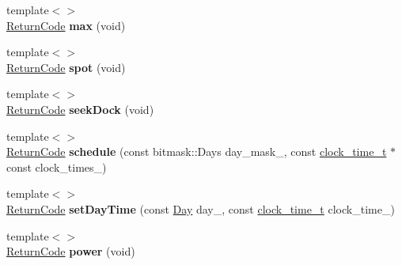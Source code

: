 \begin{DoxyCompactItemize}
\item 
\hypertarget{classroomba_1_1_open_interface_afea611c218b6c8d7af64409b6a982d09}{{\footnotesize template$<$$>$ }\\\hyperlink{namespaceroomba_aff53babe0af88b1ea8b066fd18b8f23f}{Return\+Code} {\bfseries max} (void)}\label{classroomba_1_1_open_interface_afea611c218b6c8d7af64409b6a982d09}

\item 
\hypertarget{classroomba_1_1_open_interface_a4eca715002e88e25727691448a3bcd13}{{\footnotesize template$<$$>$ }\\\hyperlink{namespaceroomba_aff53babe0af88b1ea8b066fd18b8f23f}{Return\+Code} {\bfseries spot} (void)}\label{classroomba_1_1_open_interface_a4eca715002e88e25727691448a3bcd13}

\item 
\hypertarget{classroomba_1_1_open_interface_a7674a0e4492d567d8ccfc0046a950e89}{{\footnotesize template$<$$>$ }\\\hyperlink{namespaceroomba_aff53babe0af88b1ea8b066fd18b8f23f}{Return\+Code} {\bfseries seek\+Dock} (void)}\label{classroomba_1_1_open_interface_a7674a0e4492d567d8ccfc0046a950e89}

\item 
\hypertarget{classroomba_1_1_open_interface_a50af82cf88624fb4d647ed61efe618e3}{{\footnotesize template$<$$>$ }\\\hyperlink{namespaceroomba_aff53babe0af88b1ea8b066fd18b8f23f}{Return\+Code} {\bfseries schedule} (const bitmask\+::\+Days day\+\_\+mask\+\_\+, const \hyperlink{structroomba_1_1clock__time__t}{clock\+\_\+time\+\_\+t} $\ast$const clock\+\_\+times\+\_\+)}\label{classroomba_1_1_open_interface_a50af82cf88624fb4d647ed61efe618e3}

\item 
\hypertarget{classroomba_1_1_open_interface_a0a3e629eb47acbff3cdd24bd3c0c8971}{{\footnotesize template$<$$>$ }\\\hyperlink{namespaceroomba_aff53babe0af88b1ea8b066fd18b8f23f}{Return\+Code} {\bfseries set\+Day\+Time} (const \hyperlink{namespaceroomba_a30df4953fe65b5b801c82a16865e50e1}{Day} day\+\_\+, const \hyperlink{structroomba_1_1clock__time__t}{clock\+\_\+time\+\_\+t} clock\+\_\+time\+\_\+)}\label{classroomba_1_1_open_interface_a0a3e629eb47acbff3cdd24bd3c0c8971}

\item 
\hypertarget{classroomba_1_1_open_interface_af4324f1ed755cda57bc338112319e5e1}{{\footnotesize template$<$$>$ }\\\hyperlink{namespaceroomba_aff53babe0af88b1ea8b066fd18b8f23f}{Return\+Code} {\bfseries power} (void)}\label{classroomba_1_1_open_interface_af4324f1ed755cda57bc338112319e5e1}


\end{DoxyCompactItemize}

